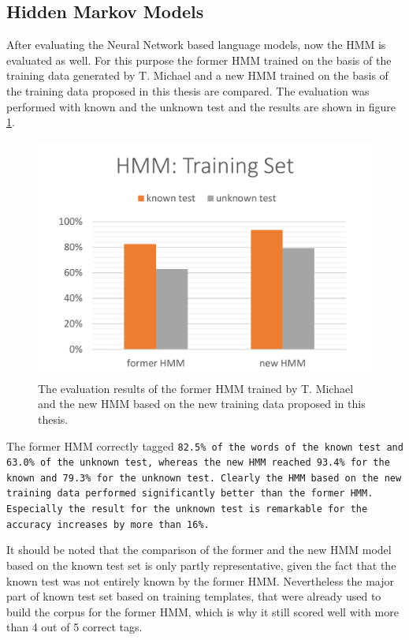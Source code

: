 \subsection{Hidden Markov Models}\label{c.evaluation.results.hmm}
After evaluating the Neural Network based language models, now the HMM is evaluated as well. For this purpose the former HMM trained on the basis of the training data generated by T. Michael \cite{michael2016} and a new HMM trained on the basis of the training data proposed in this thesis are compared. The evaluation was performed with known and the unknown test and the results are shown in figure \ref{f.evaluation.hmm}.

\begin{figure}[H]
	\centering\includegraphics[width=.7\textwidth]{images/evaluation_hmm}
	\caption[HMM Evaluation]{The evaluation results of the former HMM trained by T. Michael \cite{michael2016} and the new HMM based on the new training data proposed in this thesis.}
	\label{f.evaluation.hmm}
\end{figure}

The former HMM correctly tagged \tt{82.5\%} of the words of the known test and \tt{63.0\%} of the unknown test, whereas the new HMM reached \tt{93.4\%} for the known and \tt{79.3\%} for the unknown test. Clearly the HMM based on the new training data performed significantly better than the former HMM. Especially the result for the unknown test is remarkable for the accuracy increases by more than \tt{16\%}.

It should be noted that the comparison of the former and the new HMM model based on the known test set is only partly representative, given the fact that the known test was not entirely known by the former HMM. Nevertheless the major part of known test set based on training templates, that were already used to build the corpus for the former HMM, which is why it still scored well with more than 4 out of 5 correct tags.


